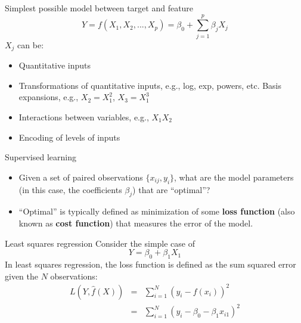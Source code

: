 \documentclass[aspectratio=169]{beamer}
\begin{document}
\begin{frame}{Simplest possible model between target and feature}
    \begin{equation*}
        Y=f(X_1,X_2,...,X_p)= \beta_0 + \sum_{j=1}^p \beta_j X_j
    \end{equation*}
    $X_j$ can be:
    \begin{itemize}
        \item Quantitative inputs
        \item Transformations of quantitative inputs, e.g., log, exp, powers, etc.
        Basis expansions, e.g., $X_2 = X_1^2$, $X_3 = X_1^3$
        \item Interactions between variables, e.g., $X_1X_2$
        \item Encoding of levels of inputs
    \end{itemize}
\end{frame}


\begin{frame}{Supervised learning}
    \begin{itemize}
        \item Given a set of paired observations $\{x_{ij}, y_i\}$, what are the model parameters (in this case, the coefficients $\beta_j$) that are ``optimal''?
        \item ``Optimal'' is typically defined as minimization of some \textbf{loss function} (also known as \textbf{cost function}) that measures the error of the model.
    \end{itemize}
\end{frame}


\begin{frame}{Least squares regression}
    Consider the simple case of
    \begin{equation*}
        Y = \beta_0 + \beta_1 X_1
    \end{equation*}
    In least squares regression, the loss function is defined as the sum squared error given the $N$ observations:
    \begin{eqnarray*}
        L(Y, \hat{f}(X)) & = & \sum_{i=1}^N (y_i - f(x_i))^2 \\
        & = & \sum_{i=1}^N (y_i - \beta_0 - \beta_1 x_{i1})^2
    \end{eqnarray*}
    \end{frame}
\end{document}
